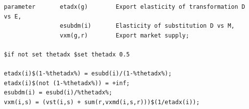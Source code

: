 \begin{Verbatim}
parameter       etadx(g)        Export elasticity of transformation D vs E,
                esubdm(i)       Elasticity of substitution D vs M,
                vxm(g,r)        Export market supply;

$if not set thetadx $set thetadx 0.5

etadx(i)$(1-%thetadx%) = esubd(i)/(1-%thetadx%);
etadx(i)$(not (1-%thetadx%)) = +inf;
esubdm(i) = esubd(i)/%thetadx%;
vxm(i,s) = (vst(i,s) + sum(r,vxmd(i,s,r)))$(1/etadx(i));
\end{Verbatim}

